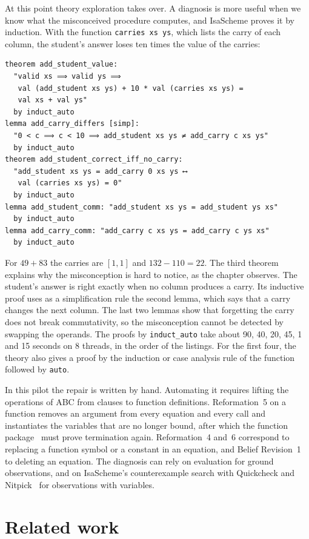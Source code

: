 \documentclass[preprint,12pt]{elsarticle}
\newcommand{\isa}[1]{\texttt{#1}}
\begin{document}
At this point theory exploration takes over. A diagnosis is more useful
when we know what the misconceived procedure computes, and IsaScheme
proves it by induction. With the function \isa{carries xs ys}, which lists
the carry of each column, the student's answer loses ten times the value of
the carries:
\begin{lstlisting}
theorem add_student_value:
  "valid xs ⟹ valid ys ⟹
   val (add_student xs ys) + 10 * val (carries xs ys) =
   val xs + val ys"
  by induct_auto
lemma add_carry_differs [simp]:
  "0 < c ⟹ c < 10 ⟹ add_student xs ys ≠ add_carry c xs ys"
  by induct_auto
theorem add_student_correct_iff_no_carry:
  "add_student xs ys = add_carry 0 xs ys ⟷
   val (carries xs ys) = 0"
  by induct_auto
lemma add_student_comm: "add_student xs ys = add_student ys xs"
  by induct_auto
lemma add_carry_comm: "add_carry c xs ys = add_carry c ys xs"
  by induct_auto
\end{lstlisting}
For $49 + 83$ the carries are $[1, 1]$ and $132 - 110 = 22$. The third
theorem explains why the misconception is hard to notice, as the chapter
observes. The student's answer is right exactly when no column produces a
carry. Its inductive proof uses as a simplification rule the second
lemma, which says that a carry changes the next column. The
last two lemmas show that forgetting the carry does not break
commutativity, so the misconception cannot be detected by swapping the
operands. The proofs by \isa{induct\_auto} take about 90, 40, 20, 45, 1 and
15 seconds on 8 threads, in the order of the listings. For the first four,
the theory also gives a proof by the induction or case analysis rule of the
function followed by \isa{auto}.

In this pilot the repair is written by hand. Automating it requires
lifting the operations of ABC from clauses to function definitions.
Reformation~5 on a function removes an argument from every equation and
every call and instantiates the variables that are no longer bound, after
which the function package~\cite{Krauss06} must prove termination again.
Reformation~4 and~6 correspond to replacing a function symbol or a
constant in an equation, and Belief Revision~1 to deleting an equation.
The diagnosis can rely on evaluation for ground observations, and on
IsaScheme's counterexample search with Quickcheck and
Nitpick~\cite{Bulwahn12,BlanchetteNipkow10} for observations with
variables.

\section{Related work}
\label{sec:related}
\end{document}
